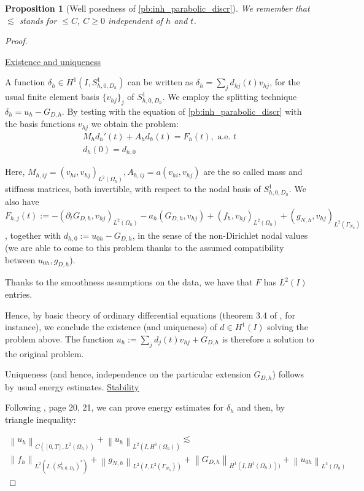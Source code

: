 \documentclass[english,a4paper,9pt,oneside]{scrbook}	%
\theoremstyle{break}
\newtheorem{prop}[equation]{Proposition}
\newenvironment{mproof}[1][\proofname]{%
  \begin{proof}[#1]$ $\par\nobreak\ignorespaces
}{%
  \end{proof}
}
\renewcommand*{\proofname}{Proof}
\theoremstyle{remark}
\newcommand{\norm}[1]{\left\lVert#1\right\rVert}
\begin{document}
\begin{appendices}
\begin{prop}[Well posedness of \cref{pb:inh_parabolic_discr}]
We remember that $\lesssim$ stands for $\leq C$, $C\geq 0$ independent of $h$ and $t$.

\end{prop}

\begin{mproof}

\underline{Existence and uniqueness}

A function $\delta_h \in H^1(I, S^1_{h,0,D_h})$ can be written as $\delta_h=\sum_j d_{hj}(t)v_{hj}$, for the usual finite element basis $\{v_{hj}\}_j$ of $S^1_{h,0,D_h}$. We employ the splitting technique $\delta_h = u_h - G_{D,h}$. By testing with the equation of \cref{pb:inh_parabolic_discr} with the basis functions $v_{hj}$ we obtain the problem:
\begin{align}
\label{eqn:ode}
	M_h d_h'(t)+A_hd_h(t)= F_h(t), \text{ a.e. } t\\
	d_h(0) = d_{h,0}	
\end{align}

Here, $M_{h,ij} = (v_{hi}, v_{hj})_{L^2(\Omega_h)}, A_{h,ij} = a(v_{hi}, v_{hj})$ are the so called mass and stiffness matrices, both invertible, with respect to the nodal basis of $S^1_{h,0,D_h}$. We also have $F_{h,j}(t):= - (\partial_t G_{D,h}, v_{hj})_{L^2(\Omega_h)} - a_h(G_{D,h}, v_{hj}) + (f_h, v_{hj})_{L^2(\Omega_h)} + (g_{N,h}, v_{hj})_{L^2(\Gamma_{N_h})}$, together with $d_{h,0}:= u_{0h} - G_{D,h}$, in the sense of the non-Dirichlet nodal values (we are able to come to this problem thanks to the assumed compatibility between $u_{0h}, g_{D,h}$).

Thanks to the smoothness assumptions on the data, we have that $F$ has $L^2(I)$ entries.

Hence, by basic theory of ordinary differential equations (theorem 3.4 of \cite{odes}, for instance), we conclude the existence (and uniqueness) of $d \in H^1(I)$ solving the problem above. The function $u_h:=\sum_j d_j(t)v_{hj} + G_{D,h}$ is therefore a solution to the original problem. 

Uniqueness (and hence, independence on the particular extension $G_{D,h}$) follows by usual energy estimates.
\underline{Stability}

Following \cite{gilardi}, page 20, 21, we can prove energy estimates for $\delta_h$ and then, by triangle inequality:

\begin{align*}
	\norm{u_h}_{C([0,T],L^2(\Omega_h))} + \norm{u_h}_{L^2(I,H^1(\Omega_h))}\lesssim \\\norm{f_h}_{L^2(I,(S^1_{h,0,D_h})^*)} + \norm{g_{N,h}}_{L^2(I,L^2(\Gamma_{N_h}))} + \norm{G_{D,h}}_{H^1(I,H^1(\Omega_h)))}+\norm{u_{0h}}_{L^2(\Omega_h)}
\end{align*}


\end{mproof}
\end{appendices}
\end{document}
